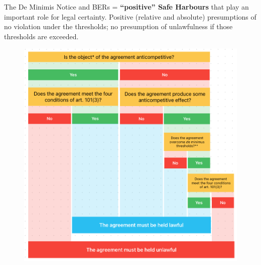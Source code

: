             The De Minimis Notice and BERs = \textbf{“positive” Safe Harbours} that play an important role for legal certainty. Positive (relative and absolute) presumptions of no violation under the thresholds; no presumption of unlawfulness if those thresholds are exceeded.

        
            \begin{figure}[h!]
                \centering
                \includegraphics[width=1\linewidth]{graphics/L8-1_final_recap.png}
            \end{figure}